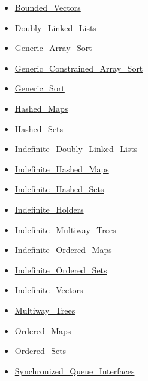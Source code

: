 \documentclass[english]{article}
\begin{document}
\begin{scriptsize}
\begin{multicols*}{5}
\begin{itemize}[leftmargin=0mm]
\begin{itemize}[leftmargin=5mm]
\begin{itemize}[leftmargin=5mm]
	\item[] \href{http://www.ada-auth.org/standards/22rm/html/RM-A-18-19.html}{Bounded\_Vectors}
	\item[] \href{http://www.ada-auth.org/standards/22rm/html/RM-A-18-3.html}{Doubly\_Linked\_Lists}
	\item[] \href{http://www.ada-auth.org/standards/22rm/html/RM-A-18-26.html}{Generic\_Array\_Sort}
	\item[] \href{http://www.ada-auth.org/standards/22rm/html/RM-A-18-26.html}{Generic\_Constrained\_Array\_Sort}
	\item[] \href{http://www.ada-auth.org/standards/22rm/html/RM-A-18-26.html}{Generic\_Sort}
	\item[] \href{http://www.ada-auth.org/standards/22rm/html/RM-A-18-5.html}{Hashed\_Maps}
	\item[] \href{http://www.ada-auth.org/standards/22rm/html/RM-A-18-8.html}{Hashed\_Sets}
	\item[] \href{http://www.ada-auth.org/standards/22rm/html/RM-A-18-12.html}{Indefinite\_Doubly\_Linked\_Lists}
	\item[] \href{http://www.ada-auth.org/standards/22rm/html/RM-A-18-13.html}{Indefinite\_Hashed\_Maps}
	\item[] \href{http://www.ada-auth.org/standards/22rm/html/RM-A-18-15.html}{Indefinite\_Hashed\_Sets}
	\item[] \href{http://www.ada-auth.org/standards/22rm/html/RM-A-18-18.html}{Indefinite\_Holders}
	\item[] \href{http://www.ada-auth.org/standards/22rm/html/RM-A-18-17.html}{Indefinite\_Multiway\_Trees}
	\item[] \href{http://www.ada-auth.org/standards/22rm/html/RM-A-18-14.html}{Indefinite\_Ordered\_Maps}
	\item[] \href{http://www.ada-auth.org/standards/22rm/html/RM-A-18-16.html}{Indefinite\_Ordered\_Sets}
	\item[] \href{http://www.ada-auth.org/standards/22rm/html/RM-A-18-11.html}{Indefinite\_Vectors}
	\item[] \href{http://www.ada-auth.org/standards/22rm/html/RM-A-18-10.html}{Multiway\_Trees}
	\item[] \href{http://www.ada-auth.org/standards/22rm/html/RM-A-18-6.html}{Ordered\_Maps}
	\item[] \href{http://www.ada-auth.org/standards/22rm/html/RM-A-18-9.html}{Ordered\_Sets}
	\item[] \href{http://www.ada-auth.org/standards/22rm/html/RM-A-18-27.html}{Synchronized\_Queue\_Interfaces}

\end{itemize}
\end{itemize}
\end{itemize}
\end{multicols*}
\end{scriptsize}
\end{document}
